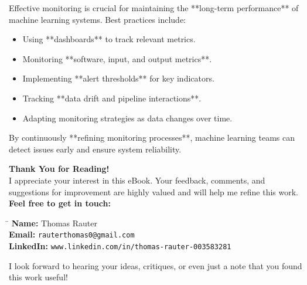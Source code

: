 \documentclass[12pt,openany]{book}
\begin{document}
Effective monitoring is crucial for maintaining the **long-term performance** of machine learning systems. Best practices include:

\begin{itemize}
    \item Using **dashboards** to track relevant metrics.
    \item Monitoring **software, input, and output metrics**.
    \item Implementing **alert thresholds** for key indicators.
    \item Tracking **data drift and pipeline interactions**.
    \item Adapting monitoring strategies as data changes over time.
\end{itemize}

By continuously **refining monitoring processes**, machine learning teams can detect issues early and ensure system reliability.



\newpage
\thispagestyle{empty}

\begin{center}
    \vspace*{\fill}
    \Large{\textbf{Thank You for Reading!}}\\[1cm]
    \normalsize{
        I appreciate your interest in this eBook. Your feedback, comments, and suggestions for improvement are highly valued and will help me refine this work.
    }\\[0.5cm]
    \textbf{Feel free to get in touch:}\\[0.5cm]
    \begin{tabbing}
        \hspace{3cm} \= \hspace{6cm} \kill
        \textbf{Name:} \> Thomas Rauter \\
        \textbf{Email:} \> \texttt{rauterthomas0@gmail.com} \\
        \textbf{LinkedIn:} \> \texttt{www.linkedin.com/in/thomas-rauter-003583281} \\
    \end{tabbing}
    \normalsize{
        I look forward to hearing your ideas, critiques, or even just a note that you found this work useful!
    }
    \\[1cm]
    \vspace*{\fill}
\end{center}
\end{document}

